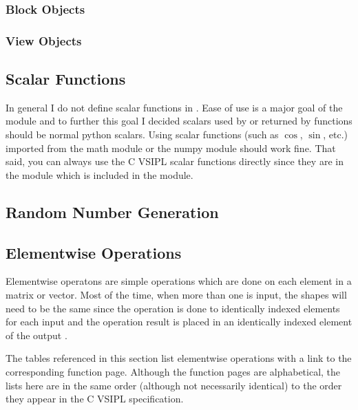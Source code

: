 \subsubsection*{Block Objects}
\subsubsection*{View Objects}
\subsection*{Scalar Functions}
In general I do not define scalar functions in \pyjv.  Ease of use is a major goal of the \pyjv module and to further this goal I decided scalars used by or returned by \pyjv functions should be normal python scalars. Using scalar functions (such as $\cos$, $\sin$, etc.) imported from the math module or the numpy module should work fine. That said, you can always use the C VSIPL scalar functions directly since they are in the  module which is included in the \pyjv module.
\subsection*{Random Number Generation}
\subsection*{Elementwise Operations}
Elementwise operatons are simple operations which are done on each element in a matrix or vector. Most of the time, when more than one  is input, the  shapes will need to be the same since the operation is done to identically indexed elements for each input  and the operation result is placed in an identically indexed element of the output . 

The tables referenced in this section list elementwise operations with a link to the corresponding function page. Although the function pages are alphabetical, the lists here are in the same order (although not necessarily identical) to the order they appear in the C VSIPL specification.
    
    
    
    
    
    
    
    
    
    
